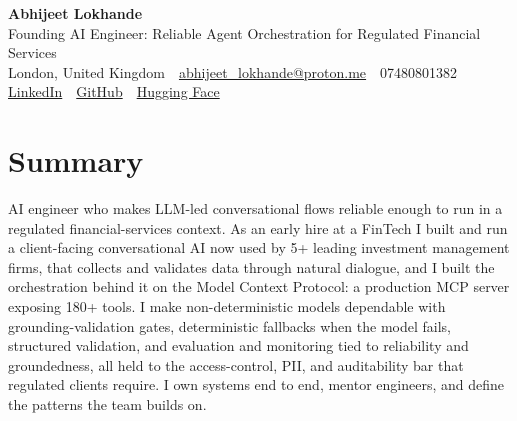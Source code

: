 \documentclass[10pt,a4paper]{article}
\newcommand{\sep}{\,\textcolor{accent!60}{\textbar}\,}
\begin{document}
\begin{center}
  {\fontsize{24}{26}\selectfont\bfseries Abhijeet Lokhande}\\[3pt]
  {\color{accent}\large Founding AI Engineer: Reliable Agent Orchestration for Regulated Financial Services}\\[5pt]
  {\small
    London, United Kingdom \sep
    \href{mailto:abhijeet_lokhande@proton.me}{abhijeet\_lokhande@proton.me} \sep
    07480801382 \\[2pt]
    \href{https://www.linkedin.com/in/ablds/}{LinkedIn} \sep
    \href{https://github.com/abhijeetscode}{GitHub} \sep
    \href{https://huggingface.co/ab-ai}{Hugging Face}
  }
\end{center}
\vspace{2pt}

\section{Summary}
AI engineer who makes LLM-led conversational flows reliable enough to run in a regulated financial-services context. As an early hire at a FinTech I built and run a client-facing conversational AI now used by 5+ leading investment management firms, that collects and validates data through natural dialogue, and I built the orchestration behind it on the Model Context Protocol: a production MCP server exposing 180+ tools. I make non-deterministic models dependable with grounding-validation gates, deterministic fallbacks when the model fails, structured validation, and evaluation and monitoring tied to reliability and groundedness, all held to the access-control, PII, and auditability bar that regulated clients require. I own systems end to end, mentor engineers, and define the patterns the team builds on.

\end{document}
